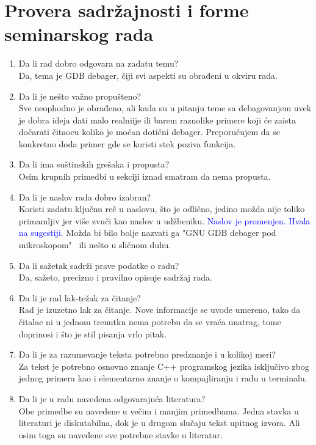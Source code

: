 \documentclass[a4paper]{report}
\newcommand{\odgovor}[1]{\textcolor{blue}{#1}}
\begin{document}
\section{Provera sadržajnosti i forme seminarskog rada}

\begin{enumerate}
\item Da li rad dobro odgovara na zadatu temu?\\
Da, tema je GDB debager, čiji svi aspekti su obrađeni u okviru rada.
\item Da li je nešto važno propušteno?\\
Sve neophodno je obrađeno, ali kada su u pitanju teme sa debagovanjem uvek je dobra ideja dati malo realniije ili barem raznolike primere koji će zaista dočarati čitaocu koliko je moćan dotični debager. Preporučujem da se konkretno doda primer gde se koristi stek poziva funkcija.
\item Da li ima suštinskih grešaka i propusta?\\
Osim krupnih primedbi u sekciji iznad smatram da nema propusta.
\item Da li je naslov rada dobro izabran?\\
Koristi zadatu ključnu reč u naslovu, što je odlično, jedino možda nije toliko primamljiv jer više zvuči kao naslov u udžbeniku.
	\odgovor{Naslov je promenjen. Hvala na sugestiji.} 
Možda bi bilo bolje nazvati ga "GNU GDB debager pod mikroskopom" \ ili nešto u sličnom duhu. 
\item Da li sažetak sadrži prave podatke o radu?\\
Da, sažeto, precizno i pravilno opisuje sadržaj rada.
\item Da li je rad lak-težak za čitanje?\\
Rad je izuzetno lak za čitanje. Nove informacije se uvode umereno, tako da čitalac ni u jednom trenutku nema potrebu da se vraća unatrag, tome doprinosi i što je stil pisanja vrlo pitak.
\item Da li je za razumevanje teksta potrebno predznanje i u kolikoj meri?\\
Za tekst je potrebno osnovno znanje C++ programskog jezika isključivo zbog jednog primera kao i elementarno znanje o kompajliranju i radu u terminalu.
\item Da li je u radu navedena odgovarajuća literatura?\\
Obe primedbe su navedene u večim i manjim primedbama. Jedna stavka u literaturi je diskutabilna, dok je u drugom slučaju tekst upitnog izvora. Ali osim toga su navedene sve potrebne stavke u literatur.

\end{enumerate}
\end{document}
